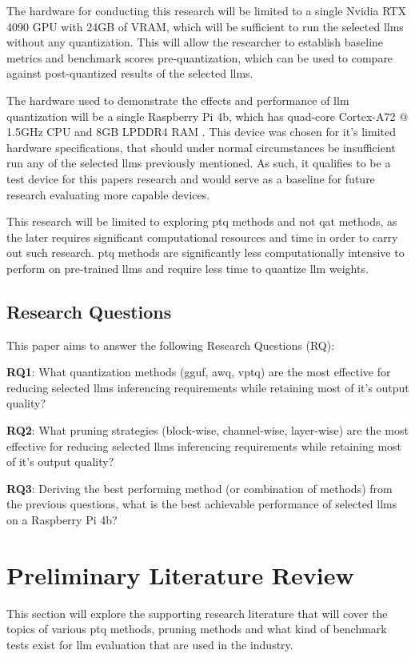 \documentclass{ifacconf}
\begin{document}
	The hardware for conducting this research will be limited to a single Nvidia RTX 4090 GPU with 24GB of VRAM, which will be sufficient to run the selected \glspl{llm} without any quantization. This will allow the researcher to establish baseline metrics and benchmark scores pre-quantization, which can be used to compare against post-quantized results of the selected \glspl{llm}.
	
	The hardware used to demonstrate the effects and performance of \gls{llm} quantization will be a single Raspberry Pi 4b, which has quad-core Cortex-A72 @ 1.5GHz CPU and 8GB LPDDR4 RAM \cite{raspberrypi4}. This device was chosen for it's limited hardware specifications, that should under normal circumstances be insufficient run any of the selected \glspl{llm} previously mentioned. As such, it qualifies to be a test device for this papers research and would serve as a baseline for future research evaluating more capable devices.
	
	This research will be limited to exploring \gls{ptq} methods and not \gls{qat} methods, as the later requires significant computational resources and time in order to carry out such research. \gls{ptq} methods are significantly less computationally intensive to perform on pre-trained \glspl{llm} and require less time to quantize \gls{llm} weights.
	
	\subsection{Research Questions}
	This paper aims to answer the following Research Questions (RQ):
	
	\textbf{RQ1}: What quantization methods (\gls{gguf}, \gls{awq}, \gls{vptq}) are the most effective for reducing selected \glspl{llm} inferencing requirements while retaining most of it's output quality?
	
	\textbf{RQ2}: What pruning strategies (block-wise, channel-wise, layer-wise) are the most effective for reducing selected \glspl{llm} inferencing requirements while retaining most of it's output quality?
	
	\textbf{RQ3}: Deriving the best performing method (or combination of methods) from the previous questions, what is the best achievable performance of selected \glspl{llm} on a Raspberry Pi 4b?
	
	
	\section{Preliminary Literature Review}
	This section will explore the supporting research literature that will cover the topics of various \gls{ptq} methods, pruning methods and what kind of benchmark tests exist for \gls{llm} evaluation that are used in the industry. 
	
\end{document}
